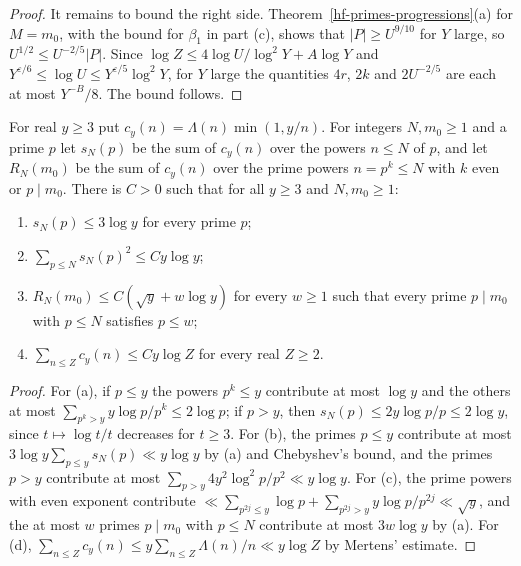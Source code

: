 \begin{proof}
It remains to bound the right side. Theorem~\ref{hf-primes-progressions}(a) for $M=m_0$, with the
bound for $\beta_1$ in part (c), shows that $|P|\geq U^{9/10}$ for $Y$ large, so
$U^{1/2}\leq U^{-2/5}|P|$. Since $\log Z\leq4\log U/\log^2Y+A\log Y$ and
$Y^{\varepsilon/6}\leq\log U\leq Y^{\varepsilon/5}\log^2Y$, for $Y$ large the quantities $4r$, $2k$
and $2U^{-2/5}$ are each at most $Y^{-B}/8$. The bound follows.
\end{proof}

\begin{lemma}\label{hf-prime-power-sums}
For real $y\geq3$ put $c_y(n)=\Lambda(n)\min(1,y/n)$. For integers $N,m_0\geq1$ and a prime $p$ let
$s_N(p)$ be the sum of $c_y(n)$ over the powers $n\leq N$ of $p$, and let $R_N(m_0)$ be the sum of
$c_y(n)$ over the prime powers $n=p^k\leq N$ with $k$ even or $p\mid m_0$. There is $C>0$ such that
for all $y\geq3$ and $N,m_0\geq1$:
\begin{enumerate}
\item $s_N(p)\leq3\log y$ for every prime $p$;
\item $\sum_{p\leq N}s_N(p)^2\leq Cy\log y$;
\item $R_N(m_0)\leq C(\sqrt y+w\log y)$ for every $w\geq1$ such that every prime $p\mid m_0$ with
  $p\leq N$ satisfies $p\leq w$;
\item $\sum_{n\leq Z}c_y(n)\leq Cy\log Z$ for every real $Z\geq2$.
\end{enumerate}
\end{lemma}

\begin{proof}
For (a), if $p\leq y$ the powers $p^k\leq y$ contribute at most $\log y$ and the others at most
$\sum_{p^k>y}y\log p/p^k\leq2\log p$; if $p>y$, then $s_N(p)\leq2y\log p/p\leq2\log y$, since
$t\mapsto\log t/t$ decreases for $t\geq3$. For (b), the primes $p\leq y$ contribute at most
$3\log y\sum_{p\leq y}s_N(p)\ll y\log y$ by (a) and Chebyshev's bound, and the primes $p>y$
contribute at most $\sum_{p>y}4y^2\log^2p/p^2\ll y\log y$. For (c), the prime powers with even
exponent contribute $\ll\sum_{p^{2j}\leq y}\log p+\sum_{p^{2j}>y}y\log p/p^{2j}\ll\sqrt y$, and the
at most $w$ primes $p\mid m_0$ with $p\leq N$ contribute at most $3w\log y$ by (a). For (d),
$\sum_{n\leq Z}c_y(n)\leq y\sum_{n\leq Z}\Lambda(n)/n\ll y\log Z$ by Mertens' estimate.
\end{proof}

